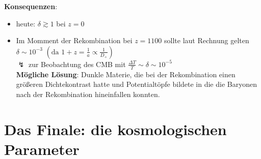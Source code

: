 \noindent \textbf{Konsequenzen}:
\begin{itemize}[label={$\cdot$}]
	\item heute: $\delta\gtrsim 1$ bei $z=0$
	\item Im Momment der Rekombination bei $z=1100$ sollte laut Rechnung gelten $\delta\sim 10^{-3}$ $\left(\text{da } 1+z=\frac{1}{a}\propto\frac{1}{D_+}\right)$\\
		$\lightning$ zur Beobachtung des CMB mit $\frac{\Delta T}{T}\sim\delta\sim 10^{-5}$\\
		\textbf{Mögliche Lösung}: Dunkle Materie, die bei der Rekombination einen größeren Dichtekontrast hatte und Potentialtöpfe bildete in die die Baryonen nach der Rekombination hineinfallen konnten.
\end{itemize}
\section{Das Finale: die kosmologischen Parameter}
